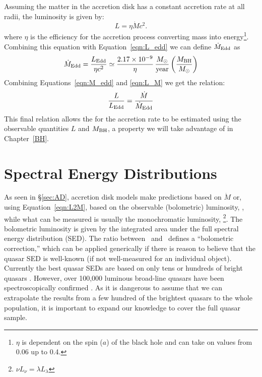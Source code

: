 Assuming the matter in the accretion disk has a constant accretion rate at all radii, the luminosity is given by:
\begin{equation} \label{eqn:L_M}
 L = \eta \dot{M} c^2.
\end{equation}
where $\eta$ is the efficiency for the accretion process converting mass into energy\footnote{$\eta$ is dependent on the spin ($a$) of the black hole and can take on values from 0.06 up to 0.4.}. Combining this equation with Equation~\ref{eqn:L_edd} we can define $\dot{M}_{\rm Edd}$ as
\begin{equation} \label{eqn:M_edd}
 \dot{M}_{\rm Edd} = \frac{L_{\rm Edd}}{\eta c^2} \simeq \frac{2.17 \times 10^{-9}}{\eta}\, \frac{M_\sun}{\rm year} \left( \frac{M_{\rm BH}}{M_\sun} \right) 
\end{equation}
Combining Equations~\ref{eqn:M_edd} and \ref{eqn:L_M}  we get the relation:
\begin{equation} \label{eqn:L2M}
 \frac{L}{L_{\rm Edd}} = \frac{\dot{M}}{\dot{M}_{\rm Edd}}
\end{equation}
This final relation allows the for the accretion rate to be estimated using the observable quantities $L$ and $M_{\rm BH}$, a property we will take advantage of in Chapter~\ref{BH}.


\section{Spectral Energy Distributions}

As seen in \S\ref{sec:AD}, accretion disk models make predictions based on $\dot{M}$ or, using Equation~\ref{eqn:L2M}, based on the observable (bolometric) luminosity, \lbol, while what can be measured is usually the monochromatic luminosity, \llam \hspace{.3em}\footnote{$\nu L_{\nu} = \lambda L_{\lambda}$}.  The bolometric luminosity is given by the integrated area under the full spectral energy distribution (SED).  The ratio between \lbol\ and \llam\ defines a ``bolometric correction,'' which can be applied generically if there is reason to believe that the quasar SED is well-known (if not well-measured for an individual object).  Currently the best quasar SEDs are based on only tens or hundreds of bright quasars \citep{Elvis:1994,Richards:2006}. However, over 100,000 luminous broad-line quasars have been spectroscopically confirmed \citep{Schneider:2010}.  As it is dangerous to assume that we can extrapolate the results from a few hundred of the brightest quasars to the whole population, it is important to expand our knowledge to cover the full quasar sample.

